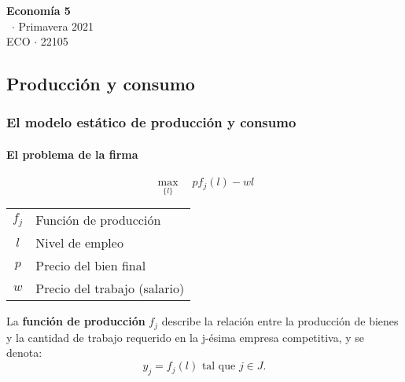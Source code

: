 \documentclass[8pt,a4paper]{extarticle}
\renewcommand{\csClass}{Economía 5}
\renewcommand{\csClassCode}{ECO $\cdot$ 22105}
\renewcommand{\csTerm}{Primavera 2021}
\begin{document}
\begin{titlepage}
	\begin{center}
		\vspace*{1cm}
		\Huge
		\textbf{\csClass}
		\vspace{0.5cm} \\
		\Large
		\cs\ $\cdot$ \csTerm
		\vfill
		\csAuthorName\\
		\vspace{0.8cm}
		\csClassCode\\
		\csSchool
	\end{center}
\end{titlepage}

\begin{multicols}{3}
	\setcounter{page}{1}

	\part{Producción y consumo}

	\section{El modelo estático de producción y consumo}

	\subsection{El problema de la firma}

	\begin{equation*}
		\max_{\{l\}} \quad pf_j (l) - wl
	\end{equation*}

	\begin{center}
		\begin{tabular}{ c l }
			\hline
			$f_j$ & Función de producción        \\
			$l$   & Nivel de empleo              \\
			$p$   & Precio del bien final        \\
			$w$   & Precio del trabajo (salario) \\
			\hline
		\end{tabular}
	\end{center}

	\begin{boxdef}
		La \textbf{función de producción} $f_j$ describe la relación entre la producción de bienes y la cantidad de trabajo requerido en la j-ésima empresa competitiva, y se denota:
		\[
			y_j = f_j(l) \text{ tal que } j \in J
			.\]
	\end{boxdef}


\end{multicols}
\end{document}
